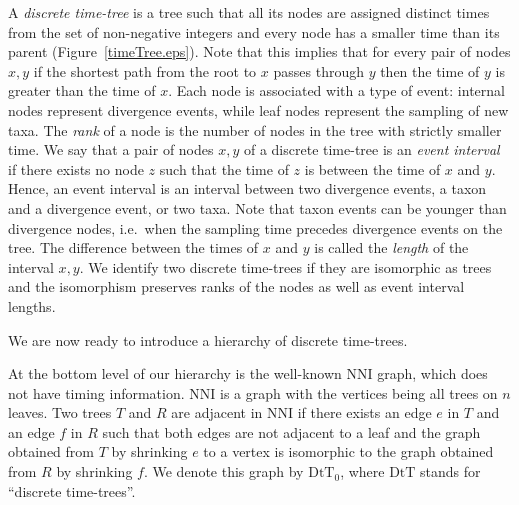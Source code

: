 \documentclass[11pt]{amsart}
\theoremstyle{definition}
\newcommand{\nni}{\mathrm{NNI}}
\newcommand{\dtt}{\mathrm{DtT}}
\begin{document}
A \emph{discrete time-tree} is a tree such that all its nodes are assigned distinct times from the set of non-negative integers and every node has a smaller time than its parent (Figure~\ref{timeTree.eps}).
Note that this implies that for every pair of nodes $x,y$ if the shortest path from the root to $x$ passes through $y$ then the time of $y$ is greater than the time of $x$.
Each node is associated with a type of event: internal nodes represent divergence events, while leaf nodes represent the sampling of new taxa.
The \emph{rank} of a node is the number of nodes in the tree with strictly smaller time.
We say that a pair of nodes $x,y$ of a discrete time-tree is an \emph{event interval} if there exists no node $z$ such that the time of $z$ is between the time of $x$ and $y$.
Hence, an event interval is an interval between two divergence events, a taxon and a divergence event, or two taxa.
Note that taxon events can be younger than divergence nodes, i.e.\ when the sampling time precedes divergence events on the tree.
The difference between the times of $x$ and $y$ is called the \emph{length} of the interval $x,y$.
We identify two discrete time-trees if they are isomorphic as trees and the isomorphism preserves ranks of the nodes as well as event interval lengths.

We are now ready to introduce a hierarchy of discrete time-trees.

At the bottom level of our hierarchy is the well-known $\nni$ graph, which does not have timing information.
$\nni$ is a graph with the vertices being all trees on $n$ leaves.
Two trees $T$ and $R$ are adjacent in $\nni$ if there exists an edge $e$ in $T$ and an edge $f$ in $R$ such that both edges are not adjacent to a leaf and the graph obtained from $T$ by shrinking $e$ to a vertex is isomorphic to the graph obtained from $R$ by shrinking $f$.
We denote this graph by $\dtt_0$, where $\dtt$ stands for ``discrete time-trees''.
\end{document}
